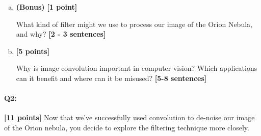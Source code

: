 \documentclass[11pt]{article}
\begin{document}
\begin{enumerate}[(a)]

\item \textbf{(Bonus)} \textbf{[1 point]}
\begin{tcolorbox}[colback=blue!5!white,colframe=blue!75!black]
What kind of filter might we use to process our image of the Orion Nebula, and why? \textbf{[2 - 3 sentences]}
\end{tcolorbox}

\pagebreak

\item \textbf{[5 points]}
\begin{tcolorbox}[colback=orange!5!white,colframe=orange!75!black]
Why is image convolution important in computer vision? Which applications can it benefit and where can it be misused? \textbf{[5-8 sentences]}
\end{tcolorbox}


\end{enumerate}


\pagebreak
\paragraph{Q2:} \textbf{[11 points]} Now that we've successfully used convolution to de-noise our image of the Orion nebula, you decide to explore the filtering technique more closely. 
\end{document}
